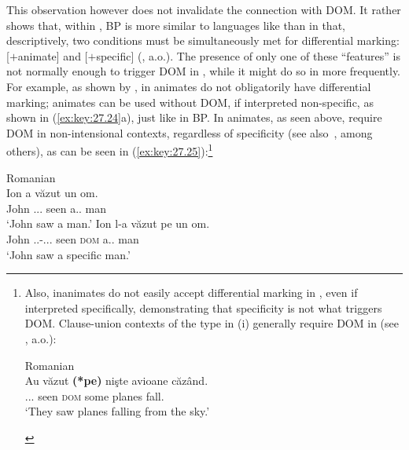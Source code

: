 \documentclass[output=paper]{langsci/langscibook}
\begin{document}
This observation however does not invalidate the connection with DOM\@. It
rather shows that, within , \gls{BP} is
more similar to languages like  than  in that,
descriptively, two conditions must be simultaneously met for differential
marking: [$+$animate] and [$+$specific]
(\citealt{Farkas1985,Dobrovie-Sorin1994,IrimiaCyrino2015}, a.o.). The presence
of only one of these \enquote{features} is not normally enough to trigger
DOM in , while it might do so in
 more frequently. For example, as shown by
\citet{IrimiaCyrino2015,IrimiaCyrino2017}, in  animates do not
obligatorily have differential marking; animates can be used without
DOM, if interpreted non-specific, as shown in
(\ref{ex:key:27.24}a), just like  in BP\@. In 
animates, as seen above, require DOM in
non-intensional contexts, regardless of specificity (see
also~\citealt{Lopez2012,Leonetti2008}, among others), as can be seen in
(\ref{ex:key:27.25}):\footnote{Also, inanimates do not easily accept
    differential marking in , even if interpreted specifically,
    demonstrating that specificity is not what triggers DOM\@. Clause-union
    contexts of the type in (i) generally require DOM in  (see \citealt{Lopez2012}, a.o.):

\begin{exe}
     Romanian\\
        \gll Au văzut \textbf{(*pe)} nişte avioane căzând.\\
            \Aux.\Tpl.\Prs.\Indic{} seen \hphantom{(*}\textsc{dom} some planes fall.\Ger{}\\
        \glt `They saw planes falling from the sky.'
\end{exe}}

\ea\label{ex:key:27.24} Romanian\\
    \ea
        \gll Ion         a                                 văzut un         om.\\
             John        \Aux.\Tsg{}.\Prs{}.\Indic{}      seen a.\M.\Sg{}    man\\
        \glt `John saw a man.'
    \ex
        \gll Ion       l-a văzut pe un om.\\
        John     \Cl.\Tsg.\M-\Aux.\Tsg{}.\Prs.\Indic{} seen \textsc{dom} a.\M.\Sg{} man\\
        \glt `John saw a specific man.'
    \z
\z
\end{document}
